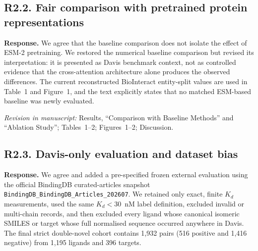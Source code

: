\documentclass[11pt,a4paper]{article}
\newcommand{\response}{\noindent\textbf{Response.} }
\newcommand{\change}[1]{\par\smallskip\noindent\textit{Revision in manuscript:} #1\par\medskip}
\begin{document}
\subsection*{R2.2. Fair comparison with pretrained protein representations}


\response We agree that the baseline comparison does not isolate the effect of
ESM-2 pretraining. We restored the numerical baseline comparison but revised its
interpretation: it is presented as Davis benchmark context, not as controlled
evidence that the cross-attention architecture alone produces the observed
differences. The current reconstructed BioInteract entity-split values are used
in Table~1 and Figure~1, and the text explicitly states that no matched
ESM-based baseline was newly evaluated.

\change{Results, ``Comparison with Baseline Methods'' and ``Ablation Study'';
Tables~1--2; Figures~1--2; Discussion.}

\subsection*{R2.3. Davis-only evaluation and dataset bias}


\response We agree and added a pre-specified frozen external evaluation using
the official BindingDB curated-articles snapshot
\texttt{BindingDB\_BindingDB\_Articles\_202607}. We retained only exact,
finite $K_d$ measurements, used the same $K_d<30$~nM label definition,
excluded invalid or multi-chain records, and then excluded every ligand whose canonical isomeric SMILES or target
whose full normalised sequence occurred anywhere in Davis. The final strict
double-novel cohort contains 1{,}932 pairs (516 positive and 1{,}416 negative)
from 1{,}195 ligands and 396 targets.
\end{document}
